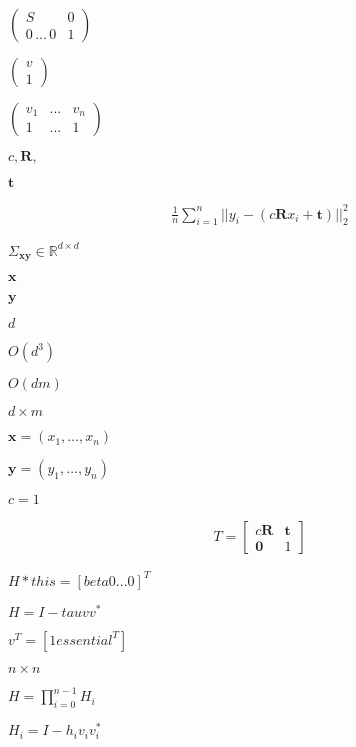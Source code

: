 \documentclass{article}
\begin{document}
$ \left( \begin{array}{cc} S & 0\\ 0\,...\,0 & 1 \end{array} \right) $
\pagebreak

$ \left( \begin{array}{c} v\\ 1 \end{array} \right) $
\pagebreak

$ \left( \begin{array}{ccc} v_1 & ... & v_n\\ 1 & ... & 1 \end{array} \right) $
\pagebreak

$ c, \mathbf{R}, $
\pagebreak

$ \mathbf{t} $
\pagebreak

\begin{align*} \frac{1}{n} \sum_{i=1}^n \vert\vert y_i - (c\mathbf{R}x_i + \mathbf{t}) \vert\vert_2^2 \end{align*}
\pagebreak

$ \Sigma_{\mathbf{x}\mathbf{y}} \in \mathbb{R}^{d \times d} $
\pagebreak

$ \mathbf{x} $
\pagebreak

$ \mathbf{y} $
\pagebreak

$d$
\pagebreak

$O(d^3)$
\pagebreak

$O(dm)$
\pagebreak

$d \times m$
\pagebreak

$ \mathbf{x} = \left( x_1, \hdots, x_n \right) $
\pagebreak

$ \mathbf{y} = \left( y_1, \hdots, y_n \right) $
\pagebreak

$ c=1 $
\pagebreak

\begin{align*} T = \begin{bmatrix} c\mathbf{R} & \mathbf{t} \\ \mathbf{0} & 1 \end{bmatrix} \end{align*}
\pagebreak

$ H *this = [ beta 0 ... 0]^T $
\pagebreak

$ H = I - tau v v^*$
\pagebreak

$ v^T = [1 essential^T] $
\pagebreak

$ n \times n $
\pagebreak

$ H = \prod_{i=0}^{n-1} H_i $
\pagebreak

$ H_i = I - h_i v_i v_i^* $
\pagebreak
\end{document}
